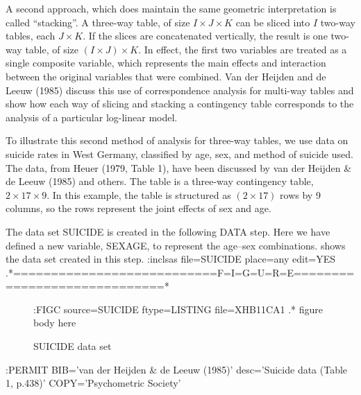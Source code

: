 A second approach, which does maintain the same geometric
interpretation is called ``stacking''.
A three-way table, of size \(I \times J \times K\) can be sliced
into \(I\) two-way tables, each \(J \times K\).
If the slices are concatenated vertically, the result is one
two-way table, of size \(( I \times J ) \times K\).
In effect, the first two variables are treated as a single
composite variable,
which represents the main effects and
interaction between
the original variables that were combined.
Van der Heijden and de Leeuw (1985) discuss this use of correspondence analysis
for multi-way tables and show how each way of slicing and
stacking a contingency table corresponds to the analysis of
a particular log-linear model.

To illustrate this second
method of analysis for three-way tables, we use data
on suicide rates in West Germany, classified
by age, sex, and method of suicide used.
The data, from Heuer (1979, Table 1),
have been discussed by van der Heijden & de Leeuw (1985) and others.
The table is a three-way contingency table, \(2 \times 17 \times 9\).
In this example, the table is structured as \((2 \times 17)\)
rows by 9 columns, so the rows represent the joint effects of sex
and age.


The data set SUICIDE is created in the following DATA step.
Here we have defined a new variable, SEXAGE, to represent the
age--sex combinations.
 shows the data set created in this step.
:inclsas file=SUICIDE place=any edit=YES
.*===========================F=I=G=U=R=E=============================*
\begin{figure}\label{suidata}
:FIGC source=SUICIDE ftype=LISTING file=XHB11CA1
.* figure body here

\caption{SUICIDE data set}
\end{figure}
:PERMIT BIB='van der Heijden & de Leeuw (1985)' desc='Suicide data (Table 1, p.438)' COPY='Psychometric Society'


